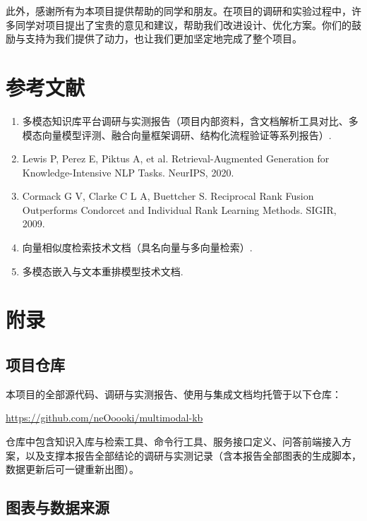 \documentclass[12pt,a4paper]{ctexart}
\begin{document}
此外，感谢所有为本项目提供帮助的同学和朋友。在项目的调研和实验过程中，许多同学对项目提出了宝贵的意见和建议，帮助我们改进设计、优化方案。你们的鼓励与支持为我们提供了动力，也让我们更加坚定地完成了整个项目。

\section{参考文献}

\begin{enumerate}[leftmargin=2.4em,itemsep=3pt]
  \item 多模态知识库平台调研与实测报告（项目内部资料，含文档解析工具对比、多模态向量模型评测、融合向量框架调研、结构化流程验证等系列报告）.
  \item Lewis P, Perez E, Piktus A, et al. Retrieval-Augmented Generation for Knowledge-Intensive NLP Tasks. NeurIPS, 2020.
  \item Cormack G V, Clarke C L A, Buettcher S. Reciprocal Rank Fusion Outperforms Condorcet and Individual Rank Learning Methods. SIGIR, 2009.
  \item 向量相似度检索技术文档（具名向量与多向量检索）.
  \item 多模态嵌入与文本重排模型技术文档.
\end{enumerate}

\appendix
\section{附录}

\subsection{项目仓库}

本项目的全部源代码、调研与实测报告、使用与集成文档均托管于以下仓库：

\begin{center}
\url{https://github.com/neOoooki/multimodal-kb}
\end{center}

仓库中包含知识入库与检索工具、命令行工具、服务接口定义、问答前端接入方案，以及支撑本报告全部结论的调研与实测记录（含本报告全部图表的生成脚本，数据更新后可一键重新出图）。

\subsection{图表与数据来源}
\end{document}
